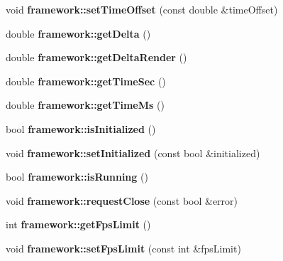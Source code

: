 \begin{DoxyCompactItemize}
void {\bfseries framework\+::set\+Time\+Offset} (const double \&time\+Offset)
\item 
\mbox{\label{classflounder_1_1framework_a1e235b88481613cc96c9fd71e32c6ec7}} 
double {\bfseries framework\+::get\+Delta} ()
\item 
\mbox{\label{classflounder_1_1framework_a78983b7a21add198232f6b2afeec62ad}} 
double {\bfseries framework\+::get\+Delta\+Render} ()
\item 
\mbox{\label{classflounder_1_1framework_a122a50cf701f06913a20470f2b86e293}} 
double {\bfseries framework\+::get\+Time\+Sec} ()
\item 
\mbox{\label{classflounder_1_1framework_aa9d22f7af8d1b6e871666b127ddaa135}} 
double {\bfseries framework\+::get\+Time\+Ms} ()
\item 
\mbox{\label{classflounder_1_1framework_a21dd36efabe66181027181771be6ef97}} 
bool {\bfseries framework\+::is\+Initialized} ()
\item 
\mbox{\label{classflounder_1_1framework_ad9a2b8281000eee4e65e3ccbe988edef}} 
void {\bfseries framework\+::set\+Initialized} (const bool \&initialized)
\item 
\mbox{\label{classflounder_1_1framework_ae1ba1a1b3d3a457991a7139612aed781}} 
bool {\bfseries framework\+::is\+Running} ()
\item 
\mbox{\label{classflounder_1_1framework_a824d3e5c8afa607a3fa7f8b45b5b3d3a}} 
void {\bfseries framework\+::request\+Close} (const bool \&error)
\item 
\mbox{\label{classflounder_1_1framework_a93f94b27dc57295c507e54ce9993ae8b}} 
int {\bfseries framework\+::get\+Fps\+Limit} ()
\item 
\mbox{\label{classflounder_1_1framework_afc03f1b305c2af306b1d393594d1f084}} 
void {\bfseries framework\+::set\+Fps\+Limit} (const int \&fps\+Limit)
\end{DoxyCompactItemize}
